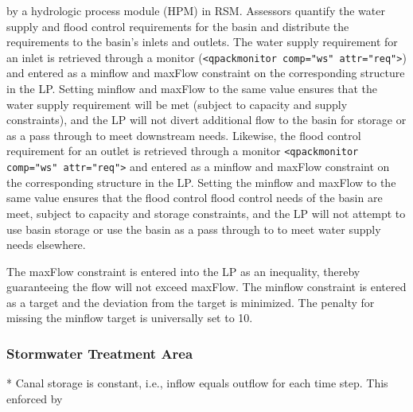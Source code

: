 by a hydrologic process module (HPM) in RSM.  Assessors quantify the
water supply and flood control requirements for the basin and
distribute the requirements to the basin's inlets and outlets.  The
water supply requirement for an inlet is retrieved through a monitor
({\tt <qpackmonitor comp="ws" attr="req">}) and entered as a minflow
and maxFlow constraint on the corresponding structure in the LP.
Setting minflow and maxFlow to the same value ensures that the water
supply requirement will be met (subject to capacity and supply
constraints), and the LP will not divert additional flow to the basin
for storage or as a pass through to meet downstream needs.  Likewise,
the flood control requirement for an outlet is retrieved through a
monitor {\tt <qpackmonitor comp="ws" attr="req">} and entered as a
minflow and maxFlow constraint on the corresponding structure in the
LP.  Setting the minflow and maxFlow to the same value ensures that
the flood control flood control needs of the basin are meet, subject
to capacity and storage constraints, and the LP will not attempt to
use basin storage or use the basin as a pass through to to meet water
supply needs elsewhere.

The maxFlow constraint is entered into the LP as an inequality,
thereby guaranteeing the flow will not exceed maxFlow.  The minflow
constraint is entered as a target and the deviation from the target is
minimized.  The penalty for missing the minflow target is universally
set to 10.


\subsubsection {Stormwater Treatment Area}
 * Canal storage is constant, i.e., inflow equals outflow for each time step.  This enforced by  


